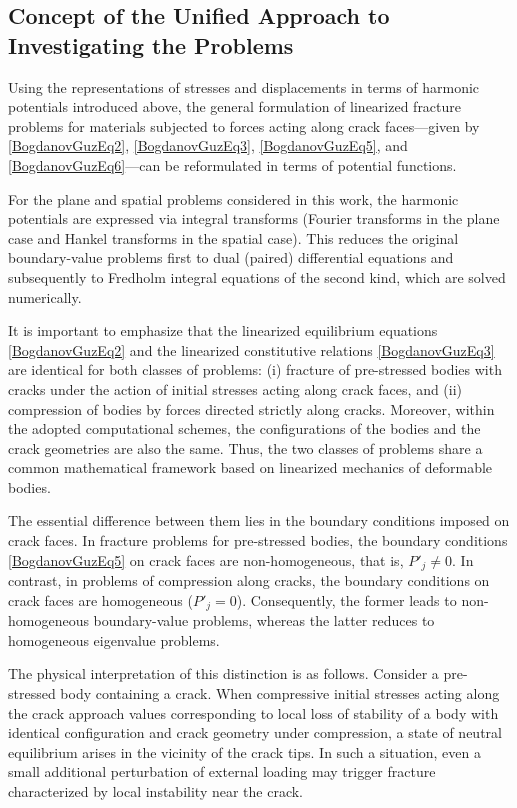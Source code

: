 \subsection{Concept of the Unified Approach to Investigating the Problems}

Using the representations of stresses and displacements in terms of harmonic potentials introduced above, the general formulation of linearized fracture problems for materials subjected to forces acting along crack faces—given by \eqref{BogdanovGuzEq2}, \eqref{BogdanovGuzEq3}, \eqref{BogdanovGuzEq5}, and \eqref{BogdanovGuzEq6}—can be reformulated in terms of potential functions. 

For the plane and spatial problems considered in this work, the harmonic potentials are expressed via integral transforms (Fourier transforms in the plane case and Hankel transforms in the spatial case). This reduces the original boundary-value problems first to dual (paired) differential equations and subsequently to Fredholm integral equations of the second kind, which are solved numerically.

It is important to emphasize that the linearized equilibrium equations \eqref{BogdanovGuzEq2} and the linearized constitutive relations \eqref{BogdanovGuzEq3} are identical for both classes of problems: (i) fracture of pre-stressed bodies with cracks under the action of initial stresses acting along crack faces, and (ii) compression of bodies by forces directed strictly along cracks. Moreover, within the adopted computational schemes, the configurations of the bodies and the crack geometries are also the same. Thus, the two classes of problems share a common mathematical framework based on linearized mechanics of deformable bodies.

The essential difference between them lies in the boundary conditions imposed on crack faces. In fracture problems for pre-stressed bodies, the boundary conditions \eqref{BogdanovGuzEq5} on crack faces are non-homogeneous, that is, $P'_j \neq 0$. In contrast, in problems of compression along cracks, the boundary conditions on crack faces are homogeneous ($P'_j = 0$). Consequently, the former leads to non-homogeneous boundary-value problems, whereas the latter reduces to homogeneous eigenvalue problems.

The physical interpretation of this distinction is as follows. Consider a pre-stressed body containing a crack. When compressive initial stresses acting along the crack approach values corresponding to local loss of stability of a body with identical configuration and crack geometry under compression, a state of neutral equilibrium arises in the vicinity of the crack tips. In such a situation, even a small additional perturbation of external loading may trigger fracture characterized by local instability near the crack.

